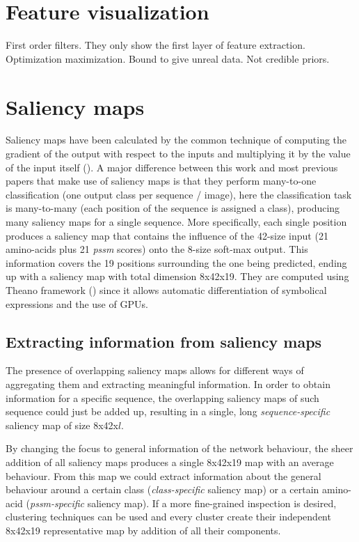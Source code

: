 		
\section{Feature visualization}
First order filters. They only show the first layer of feature extraction.
Optimization maximization. Bound to give unreal data. Not credible priors.


\section{Saliency maps} \label{sect:saliency}

Saliency maps have been calculated by the common technique of computing the gradient of the output with respect to the inputs and multiplying it by the value of the input itself (\cite{Shrikumar2016}). A major difference between this work and most previous papers that make use of saliency maps is that they perform many-to-one classification (one output class per sequence / image), here the classification task is many-to-many (each position of the sequence is assigned a class), producing many saliency maps for a single sequence. More specifically, each single position produces a saliency map that contains the influence of the 42-size input (21 amino-acids plus 21 \textit{pssm} scores) onto the 8-size soft-max output. This information covers the 19 positions surrounding the one being predicted, ending up with a saliency map with total dimension 8x42x19. They are computed using Theano framework (\cite{TheTheanoDevelopmentTeam2016}) since it allows automatic differentiation of symbolical expressions and the use of GPUs.

	\subsection{Extracting information from saliency maps}
	The presence of overlapping saliency maps allows for different ways of aggregating them and extracting meaningful information. In order to obtain information for a specific sequence, the overlapping saliency maps of such sequence could just be added up, resulting in a single, long \textit{sequence-specific} saliency map of size 8x42x$l$.
	
	By changing the focus to general information of the network behaviour, the sheer addition of all saliency maps produces a single 8x42x19 map with an average behaviour. From this map we could extract information about the general behaviour around a certain class (\textit{class-specific} saliency map) or a certain amino-acid (\textit{pssm-specific} saliency map). If a more fine-grained inspection is desired, clustering techniques can be used and every cluster create their independent 8x42x19 representative map by addition of all their components.
	
